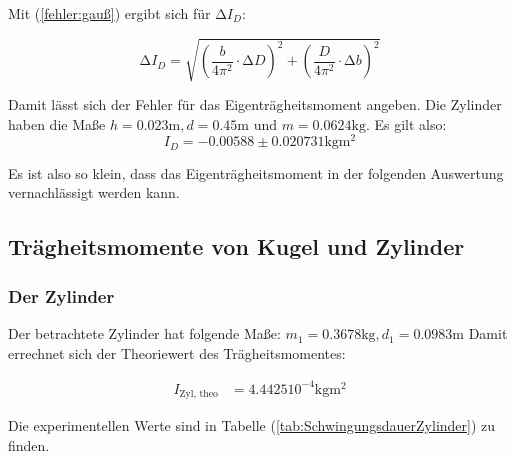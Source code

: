 Mit (\ref{fehler:gauß}) ergibt sich  für $\increment I_{D}$:

\begin{equation*}
  \increment I_{D} = \sqrt{\left(\frac{b}{4 \pi^2} \cdot  \increment D\right)^2 + \left(\frac{D}{4 \pi^2} \cdot  \increment b\right)^2}
\end{equation*}


Damit lässt sich der Fehler für das Eigenträgheitsmoment angeben.
Die Zylinder haben die Maße $h = 0.023 \unit{\meter}, d = 0.45 \unit{\meter} \text{ und } m = 0.0624 \unit{\kilo\gram}$.
Es gilt also:
\begin{equation*}
  I_{D} =  -0.00588 \pm 0.020731 \unit{\kilo\gram\meter\squared}
\end{equation*}

Es ist also so klein, dass das Eigenträgheitsmoment in der folgenden Auswertung vernachlässigt werden kann.


\subsection{Trägheitsmomente von Kugel und Zylinder}
\label{sec:KugelundZylinder}

\subsubsection*{Der Zylinder}
Der betrachtete Zylinder hat folgende Maße: $m_1 = 0.3678 \unit{\kilo\gram}, d_1 = 0.0983 \unit{\meter}$
Damit errechnet sich der Theoriewert des Trägheitsmomentes:

\begin{align*}
  I_{\text{Zyl, theo}} &= 4.4425 10^{-4} \unit{\kilo\gram\meter\squared}
\end{align*}

Die experimentellen Werte sind in Tabelle (\ref{tab:SchwingungsdauerZylinder}) zu finden.


